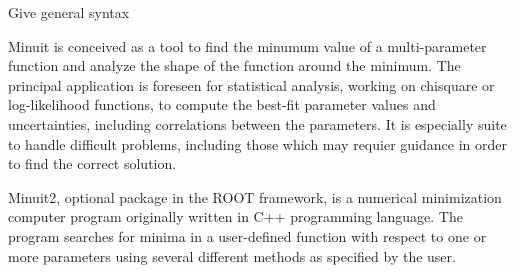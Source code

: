 Give general syntax


Minuit is conceived as a tool to find the minumum value of a
multi-parameter function and analyze the shape of the function around
the minimum. The principal application is foreseen for statistical
analysis, working on chisquare or log-likelihood functions, to compute
the best-fit parameter values and uncertainties, including
correlations between the parameters. It is especially suite to handle
difficult problems, including those which may requier guidance in
order to find the correct solution.

Minuit2, optional package in the ROOT framework, is a numerical minimization computer program
originally written in C++ programming language. The program searches for minima in a user-defined function with
respect to one or more parameters using several different methods as
specified by the user. 
